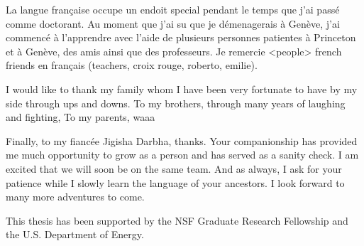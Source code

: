La langue française occupe un endoit special pendant le temps que j'ai passé comme doctorant.
Au moment que j'ai su que je démenagerais à Genève, j'ai commencé à l'apprendre avec l'aide de
plusieurs personnes patientes à Princeton et à Genève, des amis ainsi que des professeurs.
Je remercie <people> french friends en français (teachers, croix rouge, roberto, emilie).

I would like to thank my family whom I have been very fortunate to have by my side through ups and
downs. To my brothers, through many years of laughing and fighting, 
To my parents, waaa

Finally, to my fiancée Jigisha Darbha, thanks. Your companionship has provided me much opportunity
to grow as a person and has served as a sanity check.
I am excited that we will soon be on the same team. And as always, I ask for your patience
while I slowly learn the language of your ancestors. I look forward to many more adventures
to come.

This thesis has been supported by the NSF Graduate Research Fellowship
and the U.S. Department of Energy.



